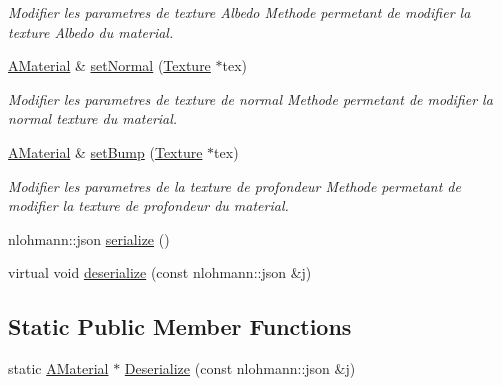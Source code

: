 \begin{DoxyCompactItemize}
\begin{DoxyCompactList}\small\item\em Modifier les parametres de texture Albedo Methode permetant de modifier la texture Albedo du material. \end{DoxyCompactList}\item 
\mbox{\hyperlink{class_beer_engine_1_1_graphics_1_1_a_material}{A\+Material}} \& \mbox{\hyperlink{class_beer_engine_1_1_graphics_1_1_a_material_aa7e96809befbf9fe3098f49aeef0d25a}{set\+Normal}} (\mbox{\hyperlink{class_beer_engine_1_1_graphics_1_1_texture}{Texture}} $\ast$tex)
\begin{DoxyCompactList}\small\item\em Modifier les parametres de texture de normal Methode permetant de modifier la normal texture du material. \end{DoxyCompactList}\item 
\mbox{\hyperlink{class_beer_engine_1_1_graphics_1_1_a_material}{A\+Material}} \& \mbox{\hyperlink{class_beer_engine_1_1_graphics_1_1_a_material_a88a94faaf480849b803302a864b30e7e}{set\+Bump}} (\mbox{\hyperlink{class_beer_engine_1_1_graphics_1_1_texture}{Texture}} $\ast$tex)
\begin{DoxyCompactList}\small\item\em Modifier les parametres de la texture de profondeur Methode permetant de modifier la texture de profondeur du material. \end{DoxyCompactList}\item 
nlohmann\+::json \mbox{\hyperlink{class_beer_engine_1_1_graphics_1_1_a_material_aaf0626af4ae3a8e004dfd3f1a23bd7c4}{serialize}} ()
\item 
virtual void \mbox{\hyperlink{class_beer_engine_1_1_graphics_1_1_a_material_afa6ac6e48d4433d62777d5fe9984faaa}{deserialize}} (const nlohmann\+::json \&j)
\end{DoxyCompactItemize}
\subsection*{Static Public Member Functions}
\begin{DoxyCompactItemize}
\item 
static \mbox{\hyperlink{class_beer_engine_1_1_graphics_1_1_a_material}{A\+Material}} $\ast$ \mbox{\hyperlink{class_beer_engine_1_1_graphics_1_1_a_material_af7b1dba516520bff75c3e71756959916}{Deserialize}} (const nlohmann\+::json \&j)
\end{DoxyCompactItemize}


